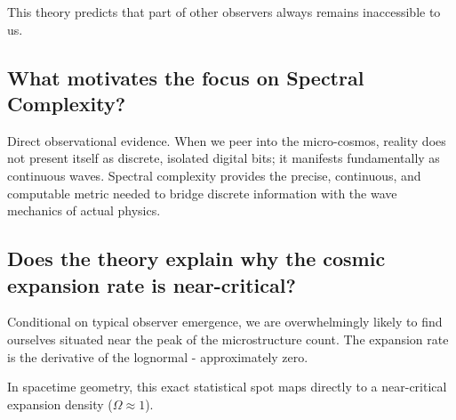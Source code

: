 This theory predicts that part of other observers always remains inaccessible to us. 


\subsection*{What motivates the focus on Spectral Complexity?}

Direct observational evidence. When we peer into the micro-cosmos, reality does not present itself as discrete, isolated digital bits;
it manifests fundamentally as continuous waves.
Spectral complexity provides the precise, continuous, and computable metric needed to bridge discrete information with the wave mechanics of actual physics.


\subsection*{Does the theory explain why the cosmic expansion rate is near-critical?}

Conditional on typical observer emergence, we are overwhelmingly likely to find ourselves situated near the peak of the microstructure count.
The expansion rate is the derivative of the lognormal - approximately zero. 

In spacetime geometry, this exact statistical spot maps directly to a near-critical expansion density ($\Omega \approx 1$).
